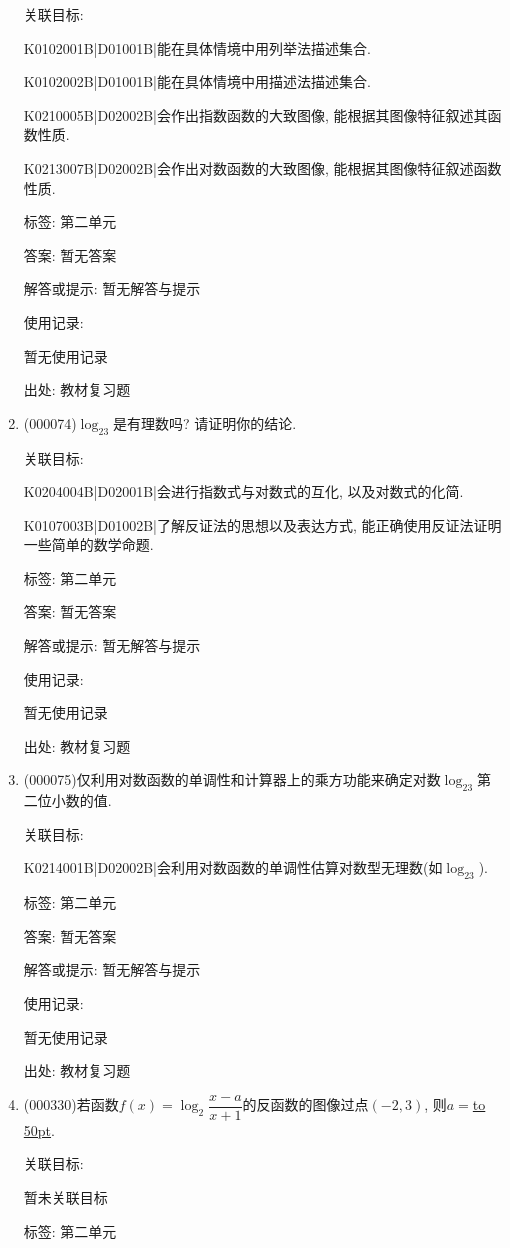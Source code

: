 \documentclass[10pt,a4paper]{article}
\newcommand{\blank}[1]{\underline{\hbox to #1pt{}}}
\begin{document}
\begin{enumerate}[1.]
关联目标:

K0102001B|D01001B|能在具体情境中用列举法描述集合.

K0102002B|D01001B|能在具体情境中用描述法描述集合.

K0210005B|D02002B|会作出指数函数的大致图像, 能根据其图像特征叙述其函数性质.

K0213007B|D02002B|会作出对数函数的大致图像, 能根据其图像特征叙述函数性质.



标签: 第二单元

答案: 暂无答案

解答或提示: 暂无解答与提示

使用记录:

暂无使用记录


出处: 教材复习题
\item { (000074)}$\log_23$是有理数吗? 请证明你的结论.


关联目标:

K0204004B|D02001B|会进行指数式与对数式的互化, 以及对数式的化简.

K0107003B|D01002B|了解反证法的思想以及表达方式, 能正确使用反证法证明一些简单的数学命题.



标签: 第二单元

答案: 暂无答案

解答或提示: 暂无解答与提示

使用记录:

暂无使用记录


出处: 教材复习题
\item { (000075)}仅利用对数函数的单调性和计算器上的乘方功能来确定对数$\log_23$第二位小数的值.


关联目标:

K0214001B|D02002B|会利用对数函数的单调性估算对数型无理数(如$\log_23$).



标签: 第二单元

答案: 暂无答案

解答或提示: 暂无解答与提示

使用记录:

暂无使用记录


出处: 教材复习题
\item { (000330)}若函数$f(x)=\log_2\dfrac{x-a}{x+1}$的反函数的图像过点$(-2,3)$, 则$a=$\blank{50}.


关联目标:

暂未关联目标



标签: 第二单元


\end{enumerate}
\end{document}

